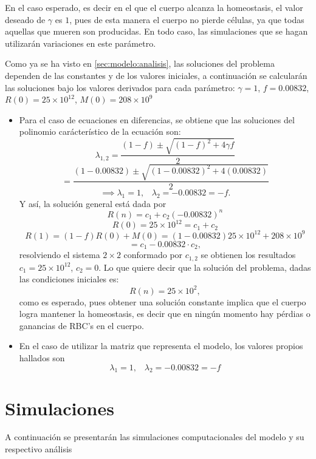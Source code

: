 En el caso esperado, es decir en el que el cuerpo alcanza la homeostasis, el valor deseado de $\gamma$ es $1$, pues de esta manera el cuerpo no pierde células, ya que todas aquellas que mueren son producidas. En todo caso, las simulaciones que se hagan utilizarán variaciones en este parámetro.

Como ya se ha visto en \ref{sec:modelo:analisis}, las soluciones del problema dependen de las constantes y de los valores iniciales, a continuación se calcularán las soluciones bajo los valores derivados para cada parámetro: $\gamma = 1$, $f = 0.00832$, $R(0)=25\times 10^{12}$, $M(0)=208\times 10^{9}$ 

\begin{itemize}
    \item Para el caso de ecuaciones en diferencias, se obtiene que las soluciones del polinomio carácterístico de la ecuación son:
        $$\lambda_{1,2}=\dfrac{(1-f)\pm\sqrt{(1-f)^2+4\gamma f}}{2}$$
        $$=\dfrac{(1-0.00832)\pm \sqrt{(1-0.00832)^2+4(0.00832)}}{2}$$
        $$\implies \lambda_1 = 1,\;\;\; \lambda_2 = -0.00832=-f.$$
        Y así, la solución general está dada por 
        $$R(n)=c_1+c_2(-0.00832)^n$$
        $$R(0)=25\times 10^{12}=c_1+c_2$$
        $$R(1)=(1-f)R(0)+M(0)=(1-0.00832)25 \times 10^{12}+208\times 10^9$$
        $$=c_1-0.00832\cdot c_2,$$
        resolviendo el sistema $2\times 2$ conformado por $c_{1,2}$ se obtienen los resultados $c_1=25\times 10^{12}$, $c_2 = 0$. Lo que quiere decir que la solución del problema, dadas las condiciones iniciales es:
        $$R(n)=25\times 10^{2},$$
        como es esperado, pues obtener una solución constante implica que el cuerpo logra mantener la homeostasis, es decir que en ningún momento hay pérdias o ganancias de RBC's en el cuerpo.
    \item En el caso de utilizar la matriz que representa el modelo, los valores propios hallados son
        $$\lambda_1 = 1, \;\;\; \lambda_2 = -0.00832=-f$$


\end{itemize}

\section{Simulaciones}\label{sec:modelo:simulaciones}
A continuación se presentarán las simulaciones computacionales del modelo y su respectivo análisis 

